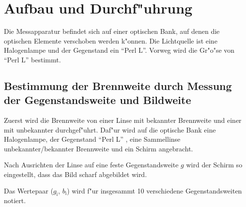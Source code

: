 \section{Aufbau und Durchf"uhrung}
	\label{sec:durchfuehrung}

	Die Messapparatur befindet sich auf einer optischen Bank, auf denen die optischen Elemente verschoben werden k"onnen.
	Die Lichtquelle ist eine Halogenlampe und der Gegenstand ein "`Perl L"'.
	Vorweg wird die Gr"o"se von "`Perl L"' bestimmt.

	\subsection{Bestimmung der Brennweite durch Messung der Gegenstandsweite und Bildweite} %
	\label{sub:bestimmung_der_brennweite_durch_messung_der_gegenstandsweite_und_bildweite}
	
	Zuerst wird die Brennweite von einer Linse mit bekannter Brennweite und einer mit unbekannter durchgef"uhrt.
	Daf"ur wird auf die optische Bank eine Halogenlampe, der Gegenstand "`Perl L"' , eine Sammellinse unbekannter/bekannter Brennweite und ein Schirm angebracht.

	Nach Ausrichten der Linse auf eine feste Gegenstandsweite $g$ wird der Schirm so eingestellt, dass das Bild scharf abgebildet wird.

	Das Wertepaar ($g_\mathrm{i}$, $b_\mathrm{i}$) wird f"ur insgesammt 10 verschiedene Gegenstandsweiten notiert.

	